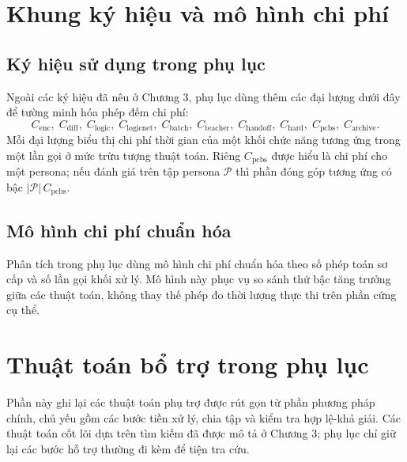 \documentclass[oneside,a4paper,12pt]{extreport}
\begin{document}
\section{Khung ký hiệu và mô hình chi phí}
\label{app:cost_model}

\subsection{Ký hiệu sử dụng trong phụ lục}
Ngoài các ký hiệu đã nêu ở Chương 3, phụ lục dùng thêm các đại lượng dưới đây để tường minh hóa phép đếm chi phí:
\begin{equation}
C_{\text{enc}},\; C_{\text{diff}},\; C_{\text{logic}},\; C_{\text{logicnet}},\; C_{\text{batch}},\; C_{\text{teacher}},\; C_{\text{handoff}},\; C_{\text{hard}},\; C_{\text{pcbs}},\; C_{\text{archive}}.
\end{equation}
Mỗi đại lượng biểu thị chi phí thời gian của một khối chức năng tương ứng trong một lần gọi ở mức trừu tượng thuật toán. Riêng $C_{\text{pcbs}}$ được hiểu là chi phí cho một persona; nếu đánh giá trên tập persona $\mathcal{P}$ thì phần đóng góp tương ứng có bậc $|\mathcal{P}|\,C_{\text{pcbs}}$.

\subsection{Mô hình chi phí chuẩn hóa}
Phân tích trong phụ lục dùng mô hình chi phí chuẩn hóa theo số phép toán sơ cấp và số lần gọi khối xử lý. Mô hình này phục vụ so sánh thứ bậc tăng trưởng giữa các thuật toán, không thay thế phép đo thời lượng thực thi trên phần cứng cụ thể.

\section{Thuật toán bổ trợ trong phụ lục}
\label{app:supplementary_algorithms}

Phần này ghi lại các thuật toán phụ trợ được rút gọn từ phần phương pháp chính, chủ yếu gồm các bước tiền xử lý, chia tập và kiểm tra hợp lệ-khả giải. Các thuật toán cốt lõi dựa trên tìm kiếm đã được mô tả ở Chương 3; phụ lục chỉ giữ lại các bước hỗ trợ thường đi kèm để tiện tra cứu.
\end{document}
